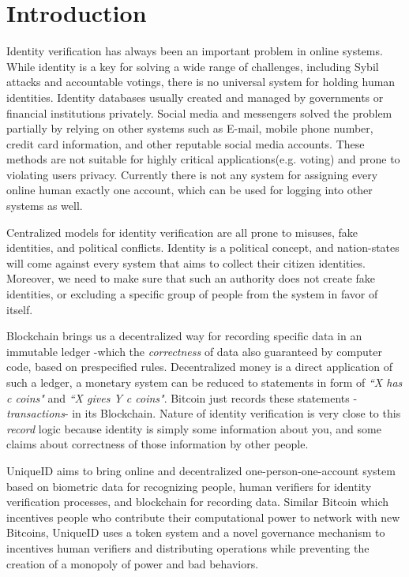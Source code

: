\documentclass[conference]{IEEEtran}
\begin{document}
\section{Introduction}
Identity verification has always been an important problem in online systems. While identity is a key for solving a wide range of challenges, including Sybil attacks \cite{Sybil} and accountable votings, there is no universal system for holding human identities. Identity databases usually created and managed by governments or financial institutions privately. Social media and messengers solved the problem partially by relying on other systems such as E-mail, mobile phone number, credit card information, and other reputable social media accounts. These methods are not suitable for highly critical applications(e.g. voting) and prone to violating users privacy. Currently there is not any system for assigning every online human exactly one account, which can be used for logging into other systems as well.


Centralized models for identity verification are all prone to misuses, fake identities, and political conflicts. Identity is a political concept, and nation-states will come against every system that aims to collect their citizen identities. Moreover, we need to make sure that such an authority does not create fake identities, or excluding a specific group of people from the system in favor of itself.


Blockchain brings us a decentralized way for recording specific data in an immutable ledger -which the \textit{correctness} of data also guaranteed by computer code, based on prespecified rules. Decentralized money is a direct application of such a ledger, a monetary system can be reduced to statements in form of \textit{``X has c coins"} and \textit{``X gives Y c coins"}. Bitcoin \cite{bitcoin} just records these statements -\textit{transactions}- in its Blockchain. Nature of identity verification is very close to this \textit{record} logic because identity is simply some information about you, and some claims about correctness of those information by other people. 


UniqueID aims to bring online and decentralized one-person-one-account system based on biometric data for recognizing people, human verifiers for identity verification processes, and blockchain for recording data. Similar Bitcoin which incentives people who contribute their computational power to network with new Bitcoins, UniqueID uses a token system and a novel governance mechanism to incentives human verifiers and distributing operations while preventing the creation of a monopoly of power and bad behaviors.
\end{document}
